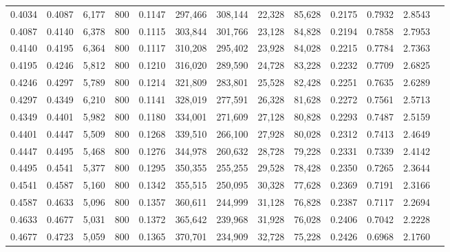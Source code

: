 \begin{tabular}{rrrrrrrrrrrrr}
0.4034 & 0.4087 &  6,177 &   800 &                                     0.1147 & 297,466 & 308,144 &  22,328 &  85,628 & 0.2175 & 0.7932 & 2.8543 \\
0.4087 & 0.4140 &  6,378 &   800 &                                     0.1115 & 303,844 & 301,766 &  23,128 &  84,828 & 0.2194 & 0.7858 & 2.7953 \\
0.4140 & 0.4195 &  6,364 &   800 &                                     0.1117 & 310,208 & 295,402 &  23,928 &  84,028 & 0.2215 & 0.7784 & 2.7363 \\
0.4195 & 0.4246 &  5,812 &   800 &                                     0.1210 & 316,020 & 289,590 &  24,728 &  83,228 & 0.2232 & 0.7709 & 2.6825 \\
0.4246 & 0.4297 &  5,789 &   800 &                                     0.1214 & 321,809 & 283,801 &  25,528 &  82,428 & 0.2251 & 0.7635 & 2.6289 \\
0.4297 & 0.4349 &  6,210 &   800 &                                     0.1141 & 328,019 & 277,591 &  26,328 &  81,628 & 0.2272 & 0.7561 & 2.5713 \\
0.4349 & 0.4401 &  5,982 &   800 &                                     0.1180 & 334,001 & 271,609 &  27,128 &  80,828 & 0.2293 & 0.7487 & 2.5159 \\
0.4401 & 0.4447 &  5,509 &   800 &                                     0.1268 & 339,510 & 266,100 &  27,928 &  80,028 & 0.2312 & 0.7413 & 2.4649 \\
0.4447 & 0.4495 &  5,468 &   800 &                                     0.1276 & 344,978 & 260,632 &  28,728 &  79,228 & 0.2331 & 0.7339 & 2.4142 \\
0.4495 & 0.4541 &  5,377 &   800 &                                     0.1295 & 350,355 & 255,255 &  29,528 &  78,428 & 0.2350 & 0.7265 & 2.3644 \\
0.4541 & 0.4587 &  5,160 &   800 &                                     0.1342 & 355,515 & 250,095 &  30,328 &  77,628 & 0.2369 & 0.7191 & 2.3166 \\
0.4587 & 0.4633 &  5,096 &   800 &                                     0.1357 & 360,611 & 244,999 &  31,128 &  76,828 & 0.2387 & 0.7117 & 2.2694 \\
0.4633 & 0.4677 &  5,031 &   800 &                                     0.1372 & 365,642 & 239,968 &  31,928 &  76,028 & 0.2406 & 0.7042 & 2.2228 \\
0.4677 & 0.4723 &  5,059 &   800 &                                     0.1365 & 370,701 & 234,909 &  32,728 &  75,228 & 0.2426 & 0.6968 & 2.1760 \\

\end{tabular}
